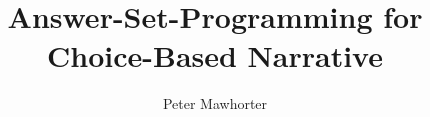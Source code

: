 
\title{Answer-Set-Programming for Choice-Based Narrative}
\author{Peter Mawhorter}
\maketitle
\newpage

\thispagestyle{empty}
\newpage

\tableofcontents

\listoffigures

\listoftables

\newpage


